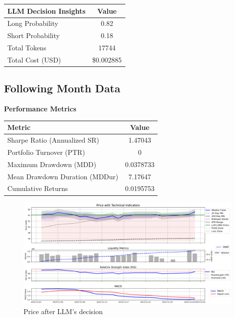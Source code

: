 \documentclass[8pt]{scrartcl}
\begin{document}
\begin{longtable}{l c}
\toprule
\textbf{LLM Decision Insights} & \textbf{Value} \\
\midrule
Long Probability & 0.82 \\
Short Probability & 0.18 \\
\midrule
Total Tokens & 17744 \\
Total Cost (USD) & \$0.002885 \\
\bottomrule
\end{longtable}

\subsection*{Following Month Data}

\textbf{Performance Metrics}

\begin{longtable}{l c}
\toprule
\textbf{Metric} & \textbf{Value} \\
\midrule
Sharpe Ratio (Annualized SR) & 1.47043 \\
Portfolio Turnover (PTR) & 0 \\
Maximum Drawdown (MDD) & 0.0378733 \\
Mean Drawdown Duration (MDDur) & 7.17647 \\
Cumulative Returns & 0.0195753 \\
\bottomrule
\end{longtable}


\begin{figure}[H]
    \centering
    \includegraphics[width=1\linewidth]{judge_reviews/MSFT_M_gpt-4o-mini/2015-11-02/llm_Price_with_Technical_Indicators.png}
    \caption{Price after LLM's decision}
\end{figure}
\end{document}
